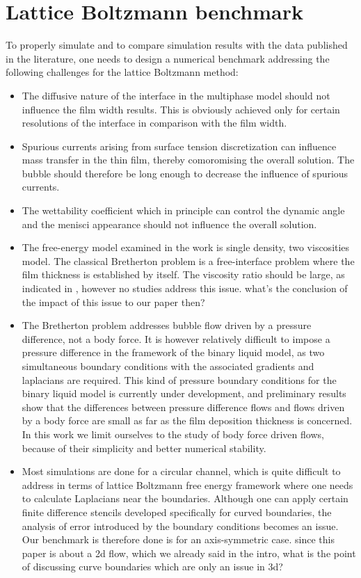 \documentclass{article}
\newcommand{\todo}[1]{{\color{red}#1}}
\begin{document}
\section{Lattice Boltzmann benchmark}
To properly simulate and to compare simulation results with the data
published in the literature, one needs to design a numerical benchmark addressing
the following challenges for the lattice Boltzmann method:
\begin{itemize}
 \item The diffusive nature of the interface in the multiphase model should not
influence the film width results. This is obviously achieved only for certain
resolutions of the interface in comparison with the film width.
 \item Spurious currents arising from surface tension discretization
can influence mass transfer in the thin film, thereby comoromising the
overall solution. The bubble should therefore be long enough to decrease the
influence of spurious currents.
 \item The wettability coefficient which in principle can control the
dynamic angle and the menisci appearance \cite{pagonabarraga-finger} should not
influence the overall solution.
 \item The free-energy model examined in the work is single density, two
viscosities model. The classical Bretherton problem is a free-interface problem
where the film thickness is established by itself. The viscosity ratio should
be large, as indicated in \cite{pagonabarraga-fingers}, however no studies
address this issue. \todo{what's the conclusion of the impact of this issue to our paper then?}
  \item The Bretherton problem addresses bubble flow driven by a pressure
difference, not a body force.  It is however relatively difficult to impose a
pressure difference in the framework of the binary liquid model, as two
simultaneous boundary conditions with the associated gradients and laplacians are required.
This kind of pressure boundary conditions for the binary liquid model is currently
under development, and preliminary results show that the differences between
pressure difference flows and flows driven by a body force are small as far as the film
deposition thickness is concerned.  In this work we limit ourselves to the study
of body force driven flows, because of their simplicity and better numerical stability.
 \item Most simulations are done for a circular channel,
which is quite difficult to address in terms of lattice Boltzmann free energy
framework where one needs to calculate Laplacians near the boundaries.
Although one can apply certain finite difference stencils
\cite{arnold-boundary,hunt-boundary} developed specifically for curved boundaries,
the analysis of error introduced by the boundary conditions becomes an issue.
Our benchmark is therefore done is for an axis-symmetric case. \todo{since this paper
is about a 2d flow, which we already said in the intro, what is the point of discussing
curve boundaries which are only an issue in 3d?}
\end{itemize}
\end{document}
